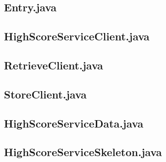 \documentclass[a4paper, 12pt]{article}
\begin{document}
\newpage
\subsection{Entry.java}\label{Entry.java}
\begin{footnotesize}
  
\end{footnotesize}

\newpage
\subsection{HighScoreServiceClient.java}\label{HighScoreServiceClient.java}
\begin{footnotesize}
  
\end{footnotesize}

\newpage
\subsection{RetrieveClient.java}\label{RetrieveClient.java}
\begin{footnotesize}
  
\end{footnotesize}

\newpage
\subsection{StoreClient.java}\label{StoreClient.java}
\begin{footnotesize}
  
\end{footnotesize}

\newpage
\subsection{HighScoreServiceData.java}\label{HighScoreServiceData.java}
\begin{footnotesize}
  
\end{footnotesize}

\newpage
\subsection{HighScoreServiceSkeleton.java}\label{HighScoreServiceSkeleton.java}
\begin{footnotesize}
  
\end{footnotesize}
\end{document}
